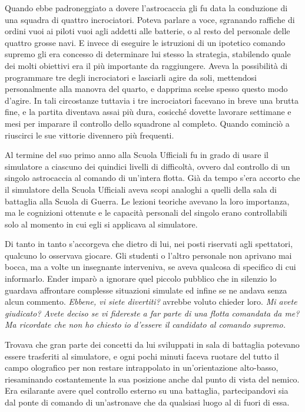 {Quando ebbe padroneggiato a dovere l'astrocaccia gli fu data la
	conduzione di una squadra di quattro incrociatori. Poteva parlare a
	voce, sgranando raffiche di ordini vuoi ai piloti vuoi agli addetti alle
	batterie, o al resto del personale delle quattro grosse navi. E invece
	di eseguire le istruzioni di un ipotetico comando supremo gli era
	concesso di determinare lui stesso la strategia, stabilendo quale dei
	molti obiettivi era il più importante da raggiungere. Aveva la
	possibilità di programmare tre degli incrociatori e lasciarli agire da
	soli, mettendosi personalmente alla manovra del quarto, e dapprima
	scelse spesso questo modo d'agire. In tali circostanze tuttavia i tre
	incrociatori facevano in breve una brutta fine, e la partita diventava
	assai più dura, cosicché dovette lavorare settimane e mesi per imparare
	il controllo dello squadrone al completo. Quando cominciò a riuscirci le
	sue vittorie divennero più frequenti.}

{Al termine del suo primo anno alla Scuola Ufficiali fu in grado di
	usare il simulatore a ciascuno dei quindici livelli di difficoltà,
	ovvero dal controllo di un singolo astrocaccia al comando di un'intera
	flotta. Già da tempo s'era accorto che il simulatore della Scuola
	Ufficiali aveva scopi analoghi a quelli della sala di battaglia alla
	Scuola di Guerra. Le lezioni teoriche avevano la loro importanza, ma le
	cognizioni ottenute e le capacità personali del singolo erano
	controllabili solo al momento in cui egli si applicava al simulatore.}

{Di tanto in tanto s'accorgeva che dietro di lui, nei posti riservati
	agli spettatori, qualcuno lo osservava giocare. Gli studenti o l'altro
	personale non aprivano mai bocca, ma a volte un insegnante interveniva,
	se aveva qualcosa di specifico di cui informarlo. Ender imparò a
	ignorare quel piccolo pubblico che in silenzio lo guardava affrontare
	complesse situazioni simulate ed infine se ne andava senza alcun
	commento. \emph{Ebbene, vi siete divertiti?} avrebbe voluto chieder
	loro. \emph{Mi avete giudicato? Avete deciso se vi fidereste a far parte
		di una flotta comandata da me? Ma ricordate che non ho chiesto io
		d'essere il candidato al comando supremo.}}

{Trovava che gran parte dei concetti da lui sviluppati in sala di
	battaglia potevano essere trasferiti al simulatore, e ogni pochi minuti
	faceva ruotare del tutto il campo olografico per non restare
	intrappolato in un'orientazione alto-basso, riesaminando costantemente
	la sua posizione anche dal punto di vista del nemico. Era esilarante
	avere quel controllo esterno su una battaglia, partecipandovi sia dal
	ponte di comando di un'astronave che da qualsiasi luogo al di fuori di
	essa.}

